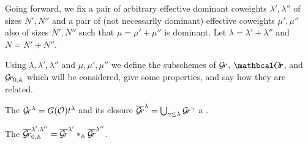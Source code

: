 \documentclass[draft]{article} %
\begin{document}
Going forward, we fix a pair of arbitrary effective dominant coweights $\lambda', \lambda'' $ of sizes $N',N''$ and a pair of (not necessarily dominant) effective coweights $\mu',\mu''$ also of sizes $N',N''$ such that $\mu = \mu' + \mu''$ is dominant. 
Let $ \lambda = \lambda' + \lambda'' $ and $ N = N'+N''$.
% 

Using $\lambda,\lambda',\lambda''$ and $\mu,\mu',\mu''$ we define the subschemes of $\mathcal{G}\!r$, $\Grth$, and ${\mathcal{G}\!r_{0,\mathbb A}}$ which will be considered, give some properties, and say how they are related.  
% 
\begin{definition}
\label{def:sphschub}
    The  $\mathcal{G}\!r^\lambda = G(\mathcal O) t^\lambda$ and its closure 
    $ \overline{\mathcal{G}\!r}^\lambda = \bigcup_{\gamma \le \lambda} \mathcal{G}\!r^{\gamma} $ 
    a .  
\end{definition}
\begin{definition}
\label{def:sphfus}
    The  $\overline{\mathcal{G}\!r}^{\lambda', \lambda''}_{0, \mathbb A} = \overline{\mathcal{G}\!r}^{\lambda'} \ast_{\mathbb A} \overline{\mathcal{G}\!r}^{\lambda''} $.
\end{definition}
\end{document}
